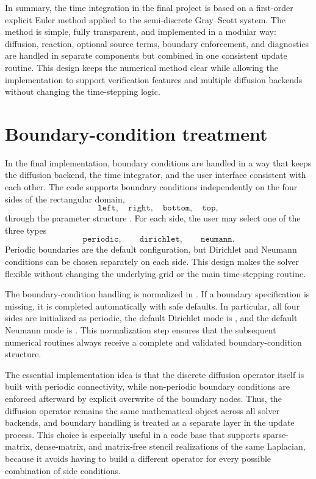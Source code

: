 In summary, the time integration in the final project is based on a first-order explicit Euler method applied to the semi-discrete Gray--Scott system. The method is simple, fully transparent, and implemented in a modular way: diffusion, reaction, optional source terms, boundary enforcement, and diagnostics are handled in separate components but combined in one consistent update routine. This design keeps the numerical method clear while allowing the implementation to support verification features and multiple diffusion backends without changing the time-stepping logic.

\section{Boundary-condition treatment}
\label{sec:numimpl_boundary_conditions}

In the final implementation, boundary conditions are handled in a way that keeps the diffusion backend, the time integrator, and the user interface consistent with each other. The code supports boundary conditions independently on the four sides of the rectangular domain,
\[
\texttt{left},\quad \texttt{right},\quad \texttt{bottom},\quad \texttt{top},
\]
through the parameter structure . For each side, the user may select one of the three types
\[
\texttt{periodic},\qquad \texttt{dirichlet},\qquad \texttt{neumann}.
\]
Periodic boundaries are the default configuration, but Dirichlet and Neumann conditions can be chosen separately on each side. This design makes the solver flexible without changing the underlying grid or the main time-stepping routine.

The boundary-condition handling is normalized in . If a boundary specification is missing, it is completed automatically with safe defaults. In particular, all four sides are initialized as periodic, the default Dirichlet mode is , and the default Neumann mode is . This normalization step ensures that the subsequent numerical routines always receive a complete and validated boundary-condition structure.

The essential implementation idea is that the discrete diffusion operator itself is built with periodic connectivity, while non-periodic boundary conditions are enforced afterward by explicit overwrite of the boundary nodes. Thus, the diffusion operator remains the same mathematical object across all solver backends, and boundary handling is treated as a separate layer in the update process. This choice is especially useful in a code base that supports sparse-matrix, dense-matrix, and matrix-free stencil realizations of the same Laplacian, because it avoids having to build a different operator for every possible combination of side conditions.

